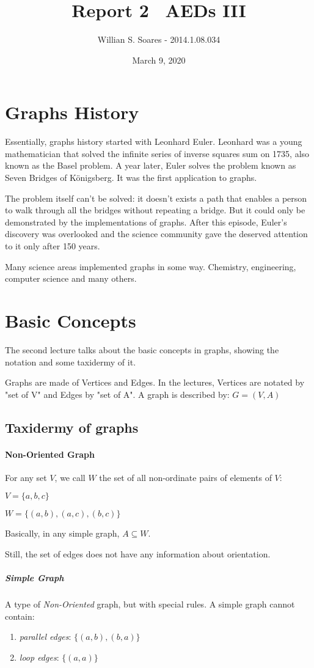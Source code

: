 \documentclass[a4paper,10pt]{article}
\title{Report 2 \textendash\ AEDs III}
\author{Willian S. Soares - 2014.1.08.034}
\date{March 9, 2020}
\begin{document}

\maketitle
\section{Graphs History}
Essentially, graphs history started with Leonhard Euler. Leonhard was a young mathematician that solved the infinite series of inverse squares sum on 1735, also known as the Basel problem. A year later, Euler solves the problem known as Seven Bridges of Königsberg. It was the first application to graphs.

The problem itself can't be solved: it doesn't exists a path that enables a person to walk through all the bridges without repeating a bridge. But it could only be demonstrated by the implementations of graphs. After this episode, Euler's discovery was overlooked and the science community gave the deserved attention to it only after 150 years.

Many science areas implemented graphs in some way. Chemistry, engineering, computer science and many others.

\section{Basic Concepts}
The second lecture talks about the basic concepts in graphs, showing the notation and some taxidermy of it.

Graphs are made of Vertices and Edges. In the lectures, Vertices are notated by "set of V" and Edges by "set of A". A graph is described by:
$ G = (V,A) $

\subsection*{Taxidermy of graphs}
\paragraph*{Non-Oriented Graph}
For any set $V$, we call $W$ the set of all non-ordinate pairs of elements of $V$:

$V = \{a,b,c\}$

$W = \{(a,b),(a,c),(b,c)\}$

Basically, in any simple graph, $ A \subseteq W $.

Still, the set of edges does not have any information about orientation.
\subparagraph*{Simple Graph}
A type of \emph{Non-Oriented} graph, but with special rules.
A simple graph cannot contain:
\begin{enumerate}
\item \emph{parallel edges}: $ \{(a,b),(b,a)\} $
\item \emph{loop edges}: $\{(a,a)\}$
\end{enumerate}
\end{document}
